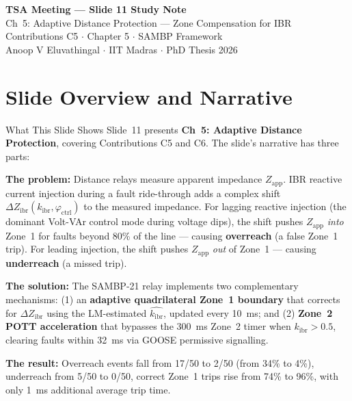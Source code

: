 \documentclass[12pt,a4paper]{article}
\newcommand{\kibr}{k_\mathrm{ibr}}
\newcommand{\Zapp}{Z_\mathrm{app}}
\newcommand{\DZibr}{\Delta Z_\mathrm{ibr}}
\begin{document}
\begin{tcolorbox}[colback=iitmnavy,coltext=white,arc=4pt,boxrule=0pt]
\begin{center}
  {\Large\bfseries TSA Meeting --- Slide 11 Study Note}\\[4pt]
  {\large Ch~5: Adaptive Distance Protection --- Zone Compensation for IBR}\\[6pt]
  {\normalsize Contributions C5 $\cdot$ Chapter 5 $\cdot$ SAMBP Framework}\\[2pt]
  {\small Anoop V Eluvathingal $\cdot$ IIT Madras $\cdot$ PhD Thesis 2026}
\end{center}
\end{tcolorbox}

\vspace{6pt}

\section{Slide Overview and Narrative}

\begin{keybox}{What This Slide Shows}
Slide~11 presents \textbf{Ch~5: Adaptive Distance Protection}, covering Contributions C5 and C6. The slide's narrative has three parts:

\textbf{The problem:} Distance relays measure apparent impedance $\Zapp$. IBR reactive current injection during a fault ride-through adds a complex shift $\DZibr(\kibr, \varphi_\mathrm{ctrl})$ to the measured impedance. For lagging reactive injection (the dominant Volt-VAr control mode during voltage dips), the shift pushes $\Zapp$ \emph{into} Zone~1 for faults beyond 80\% of the line --- causing \textbf{overreach} (a false Zone~1 trip). For leading injection, the shift pushes $\Zapp$ \emph{out} of Zone~1 --- causing \textbf{underreach} (a missed trip).

\textbf{The solution:} The SAMBP-21 relay implements two complementary mechanisms: (1) an \textbf{adaptive quadrilateral Zone~1 boundary} that corrects for $\DZibr$ using the LM-estimated $\hat{\kibr}$, updated every 10~ms; and (2) \textbf{Zone~2 POTT acceleration} that bypasses the 300~ms Zone~2 timer when $\kibr > 0.5$, clearing faults within 32~ms via GOOSE permissive signalling.

\textbf{The result:} Overreach events fall from 17/50 to 2/50 (from 34\% to 4\%), underreach from 5/50 to 0/50, correct Zone~1 trips rise from 74\% to 96\%, with only 1~ms additional average trip time.
\end{keybox}
\end{document}
